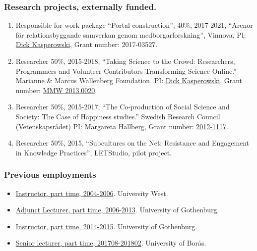 \documentclass[
]{article}
\providecommand{\tightlist}{%
  \setlength{\itemsep}{0pt}\setlength{\parskip}{0pt}}
\begin{document}
\hypertarget{research-projects-externally-funded.}{%
\subsubsection{\texorpdfstring{Research projects, externally funded.
}{Research projects, externally funded. }}\label{research-projects-externally-funded.}}

\begin{enumerate}
\def\labelenumi{\arabic{enumi}.}
\tightlist
\item
  Responsible for work package ``Portal construction'', 40\%, 2017-2021,
  ``Arenor för relationsbyggande samverkan genom medborgarforskning'',
  Vinnova, PI: \href{mailto:dick.kasperowski@gu.se}{Dick Kasperowski},
  Grant number: 2017-03527.
\item
  Researcher 50\%, 2015-2018, ``Taking Science to the Crowd:
  Researchers, Programmers and Volunteer Contributors Transforming
  Science Online.'' Marianne \& Marcus Wallenberg Foundation. PI:
  \href{mailto:dick.kasperowski@gu.se}{Dick Kasperowski}, Grant number:
  \href{https://www.wallenberg.com/MMW/projektanslag-2013}{MMW
  2013.0020}.
\item
  Researcher 50\%, 2015-2017, ``The Co-production of Social Science and
  Society: The Case of Happiness studies.'' Swedish Research Council
  (Vetenskapsrådet) PI: Margareta Hallberg, Grant number:
  \href{http://vrproj.vr.se/detail.asp?arendeid=90421}{2012-1117}.
\item
  Researcher 50\%, 2015, ``Subcultures on the Net: Resistance and
  Engagement in Knowledge Practices'', LETStudio, pilot project.
\end{enumerate}

\hypertarget{previous-employments}{%
\subsubsection{Previous employments}\label{previous-employments}}

\begin{itemize}
\tightlist
\item
  \href{http://files.christopherkullenberg.se/universitywest.pdf}{Instructor,
  part time, 2004-2006}. University West.
\item
  \href{http://files.christopherkullenberg.se/anstallningarGU.pdf}{Adjunct
  Lecturer, part time, 2006-2013}. University of Gothenburg.
\item
  \href{http://files.christopherkullenberg.se/anstallningarGU.pdf}{Instructor,
  part time, 2014-2015}. University of Gothenburg.
\item
  \href{http://files.christopherkullenberg.se/anstallningsbeslutboras.pdf}{Senior
  lecturer, part time, 201708-201802}. University of Borås.
\end{itemize}
\end{document}
